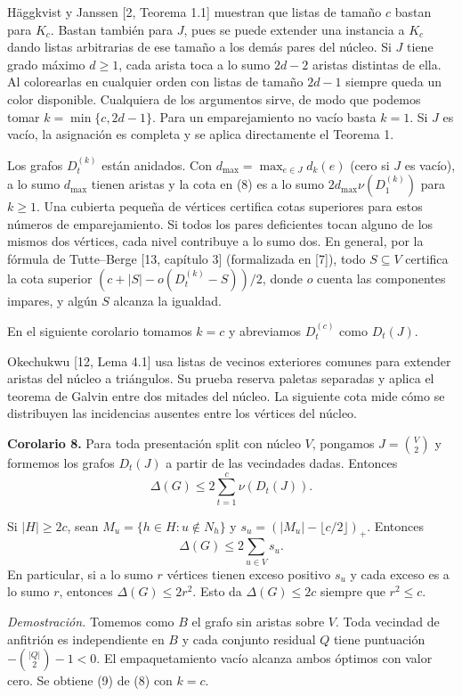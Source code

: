\documentclass[spanish,11pt,a4paper]{article}
\begin{document}
Häggkvist y Janssen {[}2, Teorema 1.1{]} muestran que listas de tamaño \(c\) bastan para \(K_c\). Bastan también para \(J\), pues se puede extender una instancia a \(K_c\) dando listas arbitrarias de ese tamaño a los demás pares del núcleo. Si \(J\) tiene grado máximo \(d\ge1\), cada arista toca a lo sumo \(2d-2\) aristas distintas de ella. Al colorearlas en cualquier orden con listas de tamaño \(2d-1\) siempre queda un color disponible. Cualquiera de los argumentos sirve, de modo que podemos tomar \(k=\min\{c,2d-1\}\). Para un emparejamiento no vacío basta \(k=1\). Si \(J\) es vacío, la asignación es completa y se aplica directamente el Teorema 1.

Los grafos \(D_t^{(k)}\) están anidados. Con \(d_{\max}=\max_{e\in J}d_k(e)\) (cero si \(J\) es vacío), a lo sumo \(d_{\max}\) tienen aristas y la cota en (8) es a lo sumo \(2d_{\max}\nu(D_1^{(k)})\) para \(k\ge1\). Una cubierta pequeña de vértices certifica cotas superiores para estos números de emparejamiento. Si todos los pares deficientes tocan alguno de los mismos dos vértices, cada nivel contribuye a lo sumo dos. En general, por la fórmula de Tutte--Berge {[}13, capítulo 3{]} (formalizada en {[}7{]}), todo \(S\subseteq V\) certifica la cota superior \((c+|S|-o(D_t^{(k)}-S))/2\), donde \(o\) cuenta las componentes impares, y algún \(S\) alcanza la igualdad.

En el siguiente corolario tomamos \(k=c\) y abreviamos \(D_t^{(c)}\) como \(D_t(J)\).

Okechukwu {[}12, Lema 4.1{]} usa listas de vecinos exteriores comunes para extender aristas del núcleo a triángulos. Su prueba reserva paletas separadas y aplica el teorema de Galvin entre dos mitades del núcleo. La siguiente cota mide cómo se distribuyen las incidencias ausentes entre los vértices del núcleo.

\textbf{Corolario 8.} Para toda presentación split con núcleo \(V\), pongamos \(J=\binom{V}{2}\) y formemos los grafos \(D_t(J)\) a partir de las vecindades dadas. Entonces
\[
\Delta(G)\le 2\sum_{t=1}^{c}\nu(D_t(J)). \tag{9}
\]

Si \(|H|\ge2c\), sean \(M_u=\{h\in H:u\notin N_h\}\) y \(s_u=(|M_u|-\lfloor c/2\rfloor)_+\). Entonces \[
\Delta(G)\le 2\sum_{u\in V}s_u. \tag{10}
\] En particular, si a lo sumo \(r\) vértices tienen exceso positivo \(s_u\) y cada exceso es a lo sumo \(r\), entonces \(\Delta(G)\le2r^2\). Esto da \(\Delta(G)\le2c\) siempre que \(r^2\le c\).

\emph{Demostración.} Tomemos como \(B\) el grafo sin aristas sobre \(V\). Toda vecindad de anfitrión es independiente en \(B\) y cada conjunto residual \(Q\) tiene puntuación \(-\binom{|Q|}{2}-1<0\). El empaquetamiento vacío alcanza ambos óptimos con valor cero. Se obtiene (9) de (8) con \(k=c\).
\end{document}

